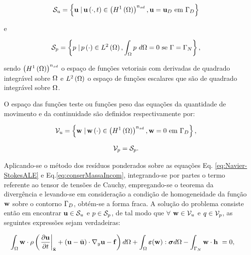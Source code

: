 \documentclass[tese_patricia]{subfiles}%
\begin{document}
\begin{align}
\mathcal{S}_u = \left\{\mathbf{u} \left . \right| \mathbf{u} \left(\cdot,t\right) \in \left(H^{1}\left(\Omega\right)\right)^{n_{sd}}, \mathbf{u} = \mathbf{u}_D \ \textrm {em} \ \Gamma_{D} \right\}
\end{align}

\noindent e

\begin{align}
\mathcal{S}_p = \left\{p \left . \right| p \left(\cdot\right) \in L^{2}\left(\Omega\right), \int_{\Omega}p \textrm { } d\Omega = 0 \textrm { se } \Gamma = \Gamma_{N} \right\},
\end{align}

\noindent sendo $\left(H^{1}\left(\Omega\right)\right)^{n_{sd}}$ o espaço de funções vetoriais com derivadas de quadrado integrável sobre $\Omega$ e $L^{2}\left(\Omega\right)$ o espaço de funções escalares que são de quadrado integrável sobre $\Omega$.

O espaço das funções teste ou funções peso das equações da quantidade de movimento e da continuidade são definidos respectivamente por:

\begin{align}
\mathcal{V}_u = \left\{\mathbf{w} \left . \right| \mathbf{w} \left(\cdot\right) \in \left(H^{1}\left(\Omega\right)\right)^{n_{sd}}, \mathbf{w} = 0 \textrm { em} \ \Gamma_{D} \right\},
\end{align}


\begin{align}
\mathcal{V}_p = \mathcal{S}_p.
\end{align}

Aplicando-se o método dos resíduos ponderados sobre as equações Eq. \eqref{eq:Navier-StokesALE} e Eq.\eqref{eq:conserMassaIncom}, integrando-se por partes o termo referente ao tensor de tensões de Cauchy, empregando-se o teorema da divergência e levando-se em consideração a condição de homogeneidade da função $\mathbf{w}$ sobre o contorno $\Gamma_D$, obtém-se a forma fraca. A solução do problema consiste então em encontrar $\mathbf{u} \in \mathcal{S}_u$ e $p \in \mathcal{S}_p$, de tal modo que $\forall$ $\mathbf{w} \in \mathcal{V}_u$ e $q \in \mathcal{V}_p$, as seguintes expressões sejam verdadeiras:


\begin{align}
\int_{\Omega} \mathbf{w} \cdot \rho  \left(\left . \frac{\partial\mathbf{u}}{\partial t} \right|_{\bar{\mathbf{x}}} + \left(\mathbf{u} - \bar{\mathbf{u}} \right)\cdot\nabla_y \mathbf{u} - \mathbf{f} \right) d\Omega + \int_{\Omega} \bm{\varepsilon}(\mathbf{w}) : \boldsymbol{\sigma}  d\Omega - \int_{\Gamma_{N}} \mathbf{w} \cdot \mathbf{h} \  &= 0,  \label{eq:NSWeakForm1} 
\end{align}
\end{document}
